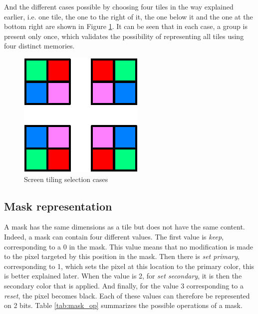 And the different cases possible by choosing four tiles in the way explained earlier, i.e. one 
tile, the one to the right of it, the one below it and the one at the bottom right are shown in
Figure \ref{fig:gpu/screen_tiling_cases}. It can be seen that in each case, a group is present only 
once, which validates the possibility of representing all tiles using four distinct memories.

\begin{figure}[H]
    \centering
    \includegraphics[scale=1.0]{Chapter4-GPU_CLKU/res/screen_tiling_cases}
    \caption{Screen tiling selection cases}
    \label{fig:gpu/screen_tiling_cases}
\end{figure}

\subsection{Mask representation}

A mask has the same dimensions as a tile but does not have the same content. Indeed, a mask can 
contain four different values. The first value is \textit{keep}, corresponding to a 0 in the mask. This 
value means that no modification is made to the pixel targeted by this position in the 
mask. Then there is \textit{set primary}, corresponding to 1, which sets the pixel at this 
location to the primary color, this is better explained later. When the value is 2, 
for \textit{set secondary}, it is then the secondary color that is applied. And 
finally, for the value 3 corresponding to a \textit{reset}, the pixel becomes black. Each of these 
values can therefore be represented on 2 bits. Table \ref{tab:mask_op} summarizes the possible 
operations of a mask.


